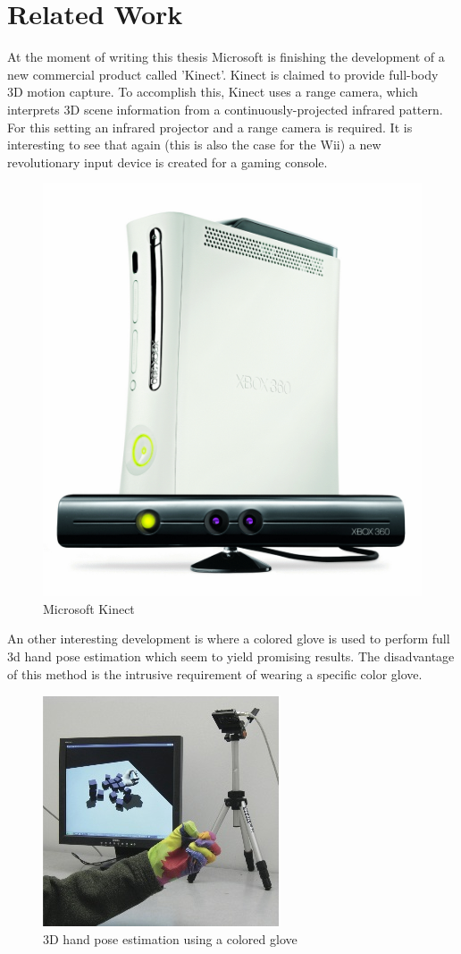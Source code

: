 \section{Related Work}
At the moment of writing this thesis Microsoft is finishing the development of a new commercial product called 'Kinect'. Kinect is claimed to provide full-body 3D motion capture. To accomplish this, Kinect uses a range camera, which interprets 3D scene information from a continuously-projected infrared pattern. For this setting an infrared projector and a range camera is required. It is interesting to see that again (this is also the case for the Wii) a new revolutionary input device is created for a gaming console. 

\begin{figure}[htbp]
	\center{}
	\label{fig:kinect}
	\includegraphics[width=0.3\linewidth]{figures/wave.jpg}
	\caption{Microsoft Kinect}
\end{figure}


An other interesting development is \cite{Wang2009} where a colored glove is used to perform full 3d hand pose estimation which seem to yield promising results. The disadvantage of this method is the intrusive requirement of wearing a specific color glove. 

\begin{figure}[htbp]
	\center{}
	\label{fig:wang2009}
	\includegraphics[width=0.4\linewidth]{figures/wang2009.jpg}
	\caption{3D hand pose estimation using a colored glove}
\end{figure}




